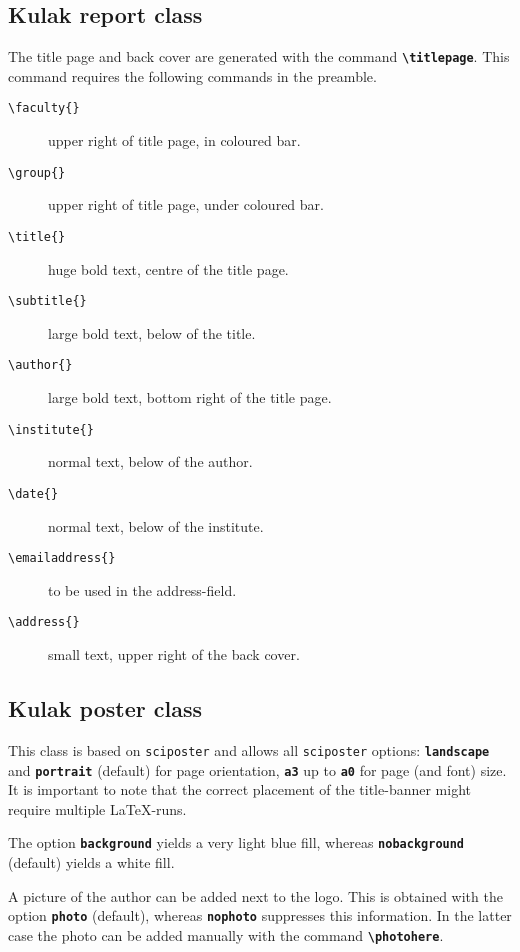 \documentclass[a4paper,kulak]{kulakarticle} %
\begin{document}
\subsection{Kulak report class}

The title page and back cover are generated with the command \textbf{\texttt{\textbackslash titlepage}}. This command requires the following commands in the preamble.

\begin{description}
\item[\texttt{\textbackslash faculty\{\}}]      upper right of title page, in coloured bar.
\item[\texttt{\textbackslash group\{\}}]        upper right of title page, under coloured bar.
\item[\texttt{\textbackslash title\{\}}]        huge bold text, centre of the title page.
\item[\texttt{\textbackslash subtitle\{\}}]     large bold text, below of the title.
\item[\texttt{\textbackslash author\{\}}]       large bold text, bottom right of the title page.
\item[\texttt{\textbackslash institute\{\}}]    normal text, below of the author.
\item[\texttt{\textbackslash date\{\}}]         normal text, below of the institute.
\item[\texttt{\textbackslash emailaddress\{\}}] to be used in the address-field.
\item[\texttt{\textbackslash address\{\}}]      small text, upper right of the back cover.
\end{description}

\subsection{Kulak poster class}

This class is based on \texttt{sciposter} and allows all \texttt{sciposter} options: \textbf{\texttt{landscape}} and \textbf{\texttt{portrait}} (default) for page orientation, \textbf{\texttt{a3}} up to \textbf{\texttt{a0}} for page (and font) size. It is important to note that the correct placement of the title-banner might require multiple \LaTeX-runs.

The option \textbf{\texttt{background}} yields a very light blue fill, whereas \textbf{\texttt{nobackground}} (default) yields a white fill.

A picture of the author can be added next to the logo. This is obtained with the option \textbf{\texttt{photo}} (default), whereas \textbf{\texttt{nophoto}} suppresses this information. In the latter case the photo can be added manually with the command \textbf{\texttt{\textbackslash photohere}}.
\end{document}
